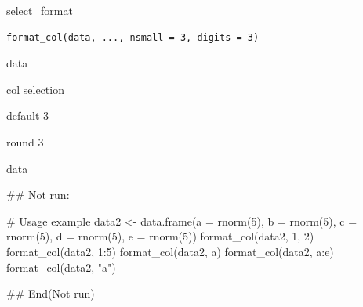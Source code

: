 \documentclass[a4paper]{book}
\begin{document}
%
\begin{Description}
select\_format
\end{Description}
%
\begin{Usage}
\begin{verbatim}
format_col(data, ..., nsmall = 3, digits = 3)
\end{verbatim}
\end{Usage}
%
\begin{Arguments}
\begin{ldescription}
\item[\code{data}] data

\item[\code{...}] col selection

\item[\code{nsmall}] default 3

\item[\code{digits}] round 3
\end{ldescription}
\end{Arguments}
%
\begin{Value}
data
\end{Value}
%
\begin{Examples}
\begin{ExampleCode}


\#\# Not run: 


# Usage example
data2 <- data.frame(a = rnorm(5), b = rnorm(5), c = rnorm(5), d = rnorm(5), e = rnorm(5))
format_col(data2, 1, 2)
format_col(data2, 1:5)
format_col(data2, a)
format_col(data2, a:e)
format_col(data2, "a")

## End(Not run)
\end{ExampleCode}
\end{Examples}
\end{document}
